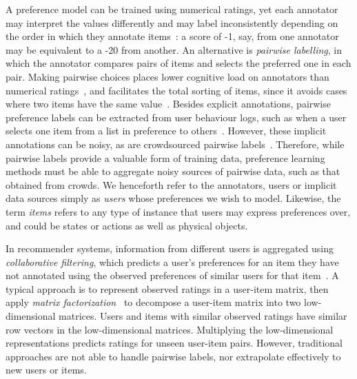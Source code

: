 A preference model can be trained using numerical ratings, yet 
each annotator may interpret the values differently and may label inconsistently depending on the order in which they annotate items~\citep{ovadia2004ratings,yannakakis2011ranking}: 
a score of -1, say, from one annotator may be equivalent to a -20 from another. 
An alternative is \emph{pairwise labelling}, 
in which the annotator compares pairs of items and selects the preferred one in each pair.
Making pairwise choices places lower cognitive load on annotators than numerical ratings~\citep{yang2011ranking},
and facilitates the total sorting of items, since it avoids cases where two items have the same value~\citep{kendall1948rank,kingsley2010preference}.
Besides explicit annotations, pairwise preference labels can be extracted from
user behaviour logs, such as when a user selects one item from a list in preference
to others~\citep{joachims2002optimizing}. 
However, these implicit annotations can be noisy, as are crowdsourced pairwise labels~\citep{habernal2016argument}.
Therefore, while pairwise labels provide a valuable
form of training data, preference learning methods must be able to 
aggregate noisy sources of pairwise data, such as that obtained from crowds.
We henceforth refer to the annotators, users or implicit data sources simply as \emph{users}
whose preferences we wish to model.
Likewise, the term \emph{items} refers to any type of instance that users may express preferences over,
and could be states or actions as well as physical objects.

In recommender systems, information from different users is aggregated using \emph{collaborative filtering},  
which predicts a user's preferences for an item they have not annotated using the observed preferences of 
similar users for that item~\citep{resnick1997recommender}.
A typical approach is to represent observed ratings in a user-item matrix,
then apply \emph{matrix factorization}~\citep{koren2009matrix}
to decompose a user-item matrix into two low-dimensional matrices.
Users and items with similar observed ratings have similar row vectors in the low-dimensional
matrices. Multiplying the low-dimensional representations predicts ratings for unseen
user-item pairs. 
However, traditional approaches are not able to handle pairwise labels,
nor extrapolate effectively to new users or items.

